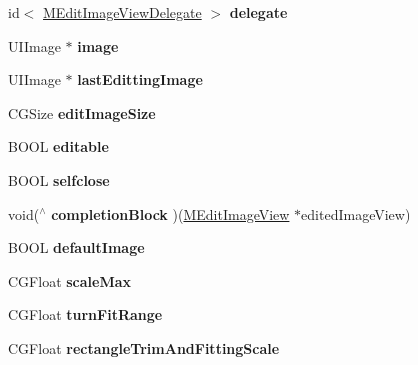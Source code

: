 \begin{DoxyCompactItemize}
\item 
\hypertarget{interface_m_edit_image_view_ad2807a857f286e4aa7da7f09be9cdd7d}{}id$<$ \hyperlink{protocol_m_edit_image_view_delegate-p}{M\+Edit\+Image\+View\+Delegate} $>$ {\bfseries delegate}\label{interface_m_edit_image_view_ad2807a857f286e4aa7da7f09be9cdd7d}

\item 
\hypertarget{interface_m_edit_image_view_a87555c0bdbd395fa294f68bb71f2b1e0}{}U\+I\+Image $\ast$ {\bfseries image}\label{interface_m_edit_image_view_a87555c0bdbd395fa294f68bb71f2b1e0}

\item 
\hypertarget{interface_m_edit_image_view_a6f40fcfd74a01c195b2def8cc26a974a}{}U\+I\+Image $\ast$ {\bfseries last\+Editting\+Image}\label{interface_m_edit_image_view_a6f40fcfd74a01c195b2def8cc26a974a}

\item 
\hypertarget{interface_m_edit_image_view_a50d840040f0d83934f4dfaf595dfc089}{}C\+G\+Size {\bfseries edit\+Image\+Size}\label{interface_m_edit_image_view_a50d840040f0d83934f4dfaf595dfc089}

\item 
\hypertarget{interface_m_edit_image_view_a42e1a571806ab211c65c34edbd9e6c82}{}B\+O\+O\+L {\bfseries editable}\label{interface_m_edit_image_view_a42e1a571806ab211c65c34edbd9e6c82}

\item 
\hypertarget{interface_m_edit_image_view_a3aca89ee13be71b5bed564f44a3953bc}{}B\+O\+O\+L {\bfseries selfclose}\label{interface_m_edit_image_view_a3aca89ee13be71b5bed564f44a3953bc}

\item 
\hypertarget{interface_m_edit_image_view_a75fec22e69fcf7336c1263e6b751fb4e}{}void($^\wedge$ {\bfseries completion\+Block} )(\hyperlink{interface_m_edit_image_view}{M\+Edit\+Image\+View} $\ast$edited\+Image\+View)\label{interface_m_edit_image_view_a75fec22e69fcf7336c1263e6b751fb4e}

\item 
\hypertarget{interface_m_edit_image_view_ab11af01c81c2a635c3c7d9dd701485db}{}B\+O\+O\+L {\bfseries default\+Image}\label{interface_m_edit_image_view_ab11af01c81c2a635c3c7d9dd701485db}

\item 
\hypertarget{interface_m_edit_image_view_abce76d1b6bbc1174dd68a8b0b51d67da}{}C\+G\+Float {\bfseries scale\+Max}\label{interface_m_edit_image_view_abce76d1b6bbc1174dd68a8b0b51d67da}

\item 
\hypertarget{interface_m_edit_image_view_acecc1bfd2f6c4cbc325fd24e2631dcf1}{}C\+G\+Float {\bfseries turn\+Fit\+Range}\label{interface_m_edit_image_view_acecc1bfd2f6c4cbc325fd24e2631dcf1}

\item 
\hypertarget{interface_m_edit_image_view_aa51eb14ed4b782cd9a1c5fa898f9f263}{}C\+G\+Float {\bfseries rectangle\+Trim\+And\+Fitting\+Scale}\label{interface_m_edit_image_view_aa51eb14ed4b782cd9a1c5fa898f9f263}

\end{DoxyCompactItemize}


